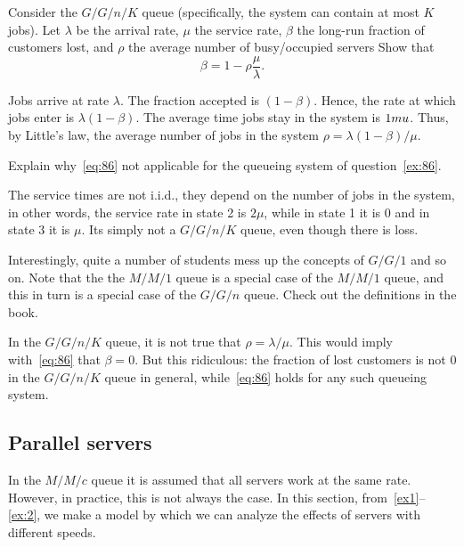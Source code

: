 \begin{exercise}[201807]
  Consider the $G/G/n/K$ queue (specifically, the system can contain at most $K$ jobs).
  Let $\lambda$ be the arrival rate, $\mu$ the service rate, $\beta$ the long-run fraction of customers lost, and $\rho$ the average number of busy/occupied servers Show that
  \begin{equation}\label{eq:86}
    \beta = 1 - \rho\frac{\mu}{\lambda}.
  \end{equation}
\begin{solution}
    Jobs arrive at rate $\lambda$.
    The fraction accepted is $(1-\beta)$.
    Hence, the rate at which jobs enter is $\lambda(1-\beta)$. The average time jobs stay in the system is $1\\mu$. Thus, by Little's law, the average number of jobs in the system $\rho=\lambda(1-\beta)/\mu$. 
\end{solution}
\end{exercise}


\begin{exercise}[201807]
  Explain why~\cref{eq:86} not applicable for the queueing system of question~\cref{ex:86}.
\begin{solution}
    The service times are not i.i.d., they depend on the number of jobs in the system, in other words, the service rate in state 2 is $2\mu$, while in state 1 it is 0 and in state 3 it is $\mu$. Its simply not a $G/G/n/K$ queue, even though there is loss. 


Interestingly, quite a number of students mess up the concepts of $G/G/1$ and so on. Note that the the $M/M/1$ queue is a special case of the $M/M/1$ queue, and this in turn is a special case of the $G/G/n$ queue. Check out the definitions in the book.

In the $G/G/n/K$ queue, it is not true that $\rho=\lambda/\mu$. This would imply with~\cref{eq:86} that $\beta=0$. But this ridiculous: the fraction of lost customers is not 0 in the $G/G/n/K$ queue in general, while~\cref{eq:86} holds for any such queueing system. 
\end{solution}
\end{exercise}

\subsection{Parallel servers}
\label{sec:parallel-servers}

In the $M/M/c$ queue it is assumed that all servers work at the same rate.
However, in practice, this is not always the case.
In this section, from~\cref{ex1}--\cref{ex:2}, we make a model by which we can analyze the effects of servers with different speeds.

